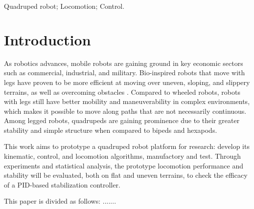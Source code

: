 \documentclass[conference]{IEEEtran}
\begin{document}
\begin{IEEEkeywords}
Quadruped robot; Locomotion; Control.
\end{IEEEkeywords}

\section{Introduction}

As robotics advances, mobile robots are gaining ground in key economic sectors such as commercial, industrial, and military. Bio-inspired robots that move with legs have proven to be more efficient at moving over uneven, sloping, and slippery terrains, as well as overcoming obstacles \cite{X.134}. Compared to wheeled robots, robots with legs still have better mobility and maneuverability in complex environments, which makes it possible to move along paths that are not necessarily continuous. Among legged robots, quadrupeds are gaining prominence due to their greater stability and simple structure when compared to bipeds and hexapods.

This work aims to prototype a quadruped robot platform for research: develop its kinematic, control, and locomotion algorithms, manufactory and test. Through experiments and statistical analysis, the prototype locomotion performance and stability will be evaluated, both on flat and uneven terrains, to check the efficacy of a PID-based stabilization controller.

This paper is divided as follows: .......


\end{document}
